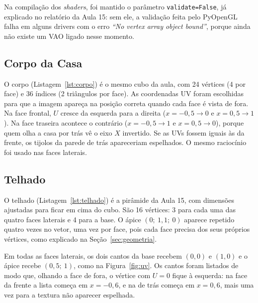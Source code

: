 \documentclass{article}
\begin{document}
Na compilação dos \textit{shaders}, foi mantido o parâmetro \texttt{validate=False}, já explicado no relatório da Aula 15: sem ele, a validação feita pelo PyOpenGL falha em alguns drivers com o erro \textit{``No vertex array object bound''}, porque ainda não existe um VAO ligado nesse momento.



\subsection{Corpo da Casa}

O corpo (Listagem~\ref{lst:corpo}) é o mesmo cubo da aula, com 24 vértices (4 por face) e 36 índices (2 triângulos por face). As coordenadas UV foram escolhidas para que a imagem apareça na posição correta quando cada face é vista de fora. Na face frontal, $U$ cresce da esquerda para a direita ($x = -0{,}5 \to 0$ e $x = 0{,}5 \to 1$). Na face traseira acontece o contrário ($x = -0{,}5 \to 1$ e $x = 0{,}5 \to 0$), porque quem olha a casa por trás vê o eixo $X$ invertido. Se as UVs fossem iguais às da frente, os tijolos da parede de trás apareceriam espelhados. O mesmo raciocínio foi usado nas faces laterais.



\subsection{Telhado}

O telhado (Listagem~\ref{lst:telhado}) é a pirâmide da Aula 15, com dimensões ajustadas para ficar em cima do cubo. São 16 vértices: 3 para cada uma das quatro faces laterais e 4 para a base. O ápice $(0;\ 1{,}1;\ 0)$ aparece repetido quatro vezes no vetor, uma vez por face, pois cada face precisa dos seus próprios vértices, como explicado na Seção~\ref{sec:geometria}.

Em todas as faces laterais, os dois cantos da base recebem $(0, 0)$ e $(1, 0)$ e o ápice recebe $(0{,}5;\ 1)$, como na Figura~\ref{fig:uv}. Os cantos foram listados de modo que, olhando a face de fora, o vértice com $U = 0$ fique à esquerda: na face da frente a lista começa em $x = -0{,}6$, e na de trás começa em $x = 0{,}6$, mais uma vez para a textura não aparecer espelhada.
\end{document}
